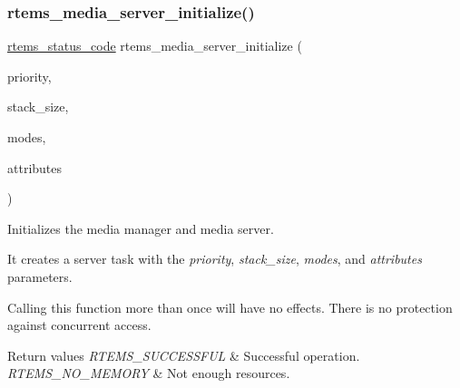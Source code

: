 \subsubsection{\texorpdfstring{rtems\_media\_server\_initialize()}{rtems\_media\_server\_initialize()}}
{\footnotesize\ttfamily \mbox{\hyperlink{group__ClassicStatus_ga545d41846817eaba6143d52ee4d9e9fe}{rtems\+\_\+status\+\_\+code}} rtems\+\_\+media\+\_\+server\+\_\+initialize (\begin{DoxyParamCaption}\item[{\mbox{\hyperlink{group__ClassicTasks_gaa80a0c0938307d1e99d0eb5fee765b47}{rtems\+\_\+task\+\_\+priority}}}]{priority,  }\item[{size\+\_\+t}]{stack\+\_\+size,  }\item[{\mbox{\hyperlink{group__ClassicModes_ga8d46a41a837840dc97336fdcd20e4f68}{rtems\+\_\+mode}}}]{modes,  }\item[{\mbox{\hyperlink{group__ClassicAttributes_gaea40313cf78ed843e09c4315d0a10f79}{rtems\+\_\+attribute}}}]{attributes }\end{DoxyParamCaption})}



Initializes the media manager and media server. 

It creates a server task with the {\itshape priority}, {\itshape stack\+\_\+size}, {\itshape modes}, and {\itshape attributes} parameters.

Calling this function more than once will have no effects. There is no protection against concurrent access.


\begin{DoxyRetVals}{Return values}
{\em R\+T\+E\+M\+S\+\_\+\+S\+U\+C\+C\+E\+S\+S\+F\+UL} & Successful operation. \\
\hline
{\em R\+T\+E\+M\+S\+\_\+\+N\+O\+\_\+\+M\+E\+M\+O\+RY} & Not enough resources. \\
\hline
\end{DoxyRetVals}
\mbox{\label{group__RTEMSIOMedia_gabe2acca9a30bcd62765c0b1c810ba89e}} 
